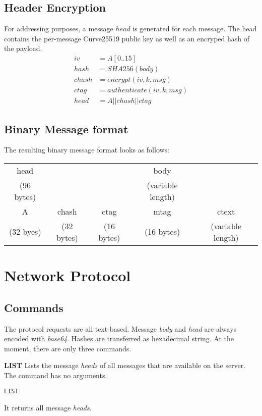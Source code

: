 \documentclass[a4paper]{article}
\begin{document}
\subsection{Header Encryption}
For addressing purposes, a message $head$ is generated for each message. The
head contains the per-message Curve25519 public key as well as an encryped hash
of the payload.
\begin{align*}
iv    &= A[0..15]\\
hash  &= SHA256(body) \\
chash &= encrypt(iv, k, msg) \\
ctag  &= authenticate(iv, k, msg) \\
head  &= A || chash || ctag
\end{align*}

\subsection{Binary Message format}
The resulting binary message format looks as follows:
\begin{center}
\begin{tabular}{ |ccc|cc| }
 \hline
 head &&& body & \\
 (96 bytes) &&& (variable length) & \\
 \hline
 A & chash & ctag & mtag & ctext \\
 (32 byes) & (32 bytes) & (16 bytes) & (16 bytes) & (variable length) \\
 \hline
\end{tabular}
\end{center}

\section{Network Protocol}

\subsection{Commands}
The protocol requests are all text-based. Message \textit{body} and
\textit{head} are always encoded with \textit{base64}. Hashes are transferred as
hexadecimal string. At the moment, there are only three commands.

\textbf{LIST} Lists the message \textit{heads} of all messages that are
available on the server. The command has no arguments.
\begin{verbatim}
LIST
\end{verbatim}
It returns all message \textit{heads}.
\end{document}
